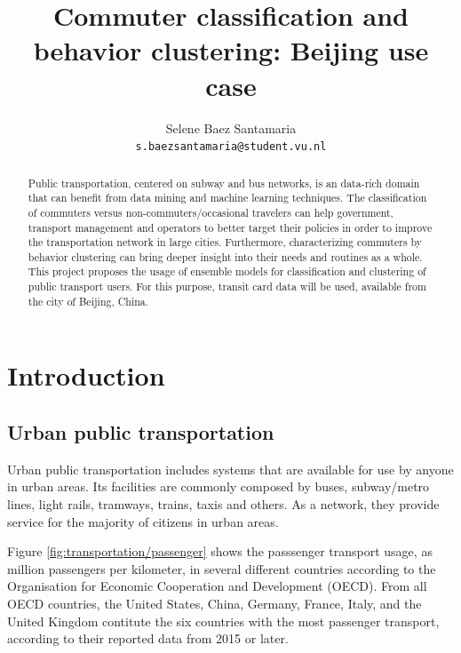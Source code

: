 \documentclass{article}
\title{Commuter classification and behavior clustering: Beijing use case}
\author{
  Selene Baez  Santamaria \\
  \texttt{s.baezsantamaria@student.vu.nl}
}
\begin{document}

\maketitle

\begin{abstract}
  Public transportation, centered on subway and bus networks, is an data-rich domain that can benefit from data mining and machine learning techniques. The classification of commuters versus non-commuters/occasional travelers can help government, transport management and operators to better target their policies in order to improve the transportation network in large cities. Furthermore, characterizing commuters by behavior clustering can bring deeper insight into their needs and routines as a whole. 
  This project proposes the usage of ensemble models for classification and clustering of public transport users. For this purpose, transit card data will be used, available from the city of Beijing, China. 
\end{abstract}

\newpage

\tableofcontents

\newpage
\section{Introduction}

\subsection{Urban public transportation}
Urban public transportation includes systems that are available for use by anyone in urban areas. Its facilities are commonly composed by buses, subway/metro lines, light rails, tramways, trains, taxis and others. As a network, they provide service for the majority of citizens in urban areas.\citep{vuchic1900urban}

Figure \ref{fig:transportation/passenger} shows the passsenger transport usage, as million passengers per kilometer, in several different countries according to the Organisation for Economic Cooperation and Development (OECD). From all OECD countries, the United States, China, Germany, France, Italy, and the United Kingdom contitute the six countries with the most passenger transport, according to their reported data from 2015 or later.\cite{OECD2017passenger} 
\end{document}
